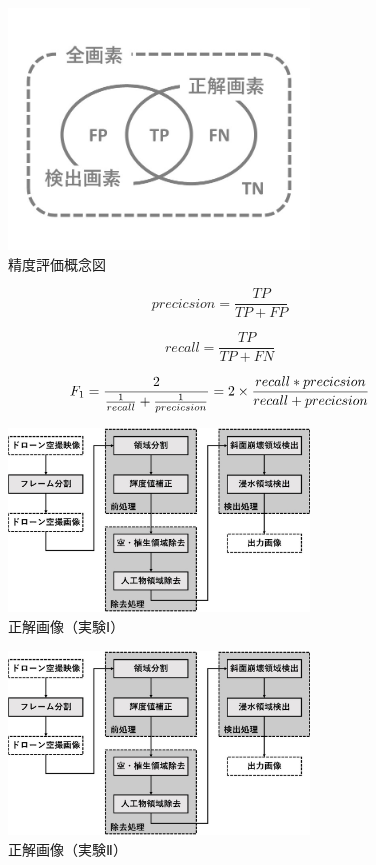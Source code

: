 \documentclass[../Thesis]{subfiles}
\begin{document}
\begin{figure}[h]
	\centering
	\includegraphics[width=8cm]{img/evaluation.jpg}
	\caption{精度評価概念図}
	\label{img21}
\end{figure}

\begin{equation}
	precicsion = \frac{TP}{TP+FP}
\end{equation}

\begin{equation}
	recall = \frac{TP}{TP+FN}
\end{equation}

\begin{equation}
	F_1 = \frac{2}{\frac{1}{recall}+\frac{1}{precicsion}} \\
	    = 2 \times \frac{recall*precicsion}{recall+precicsion}
\end{equation}

\begin{figure}[h]
	\centering
	\includegraphics[width=8cm]{img/howto3.jpg}
	\caption{正解画像（実験Ⅰ）}
	\label{img22}
\end{figure}
\begin{figure}[h]
	\centering
	\includegraphics[width=8cm]{img/howto3.jpg}
	\caption{正解画像（実験Ⅱ）}
	\label{img23}
\end{figure}
\end{document}
